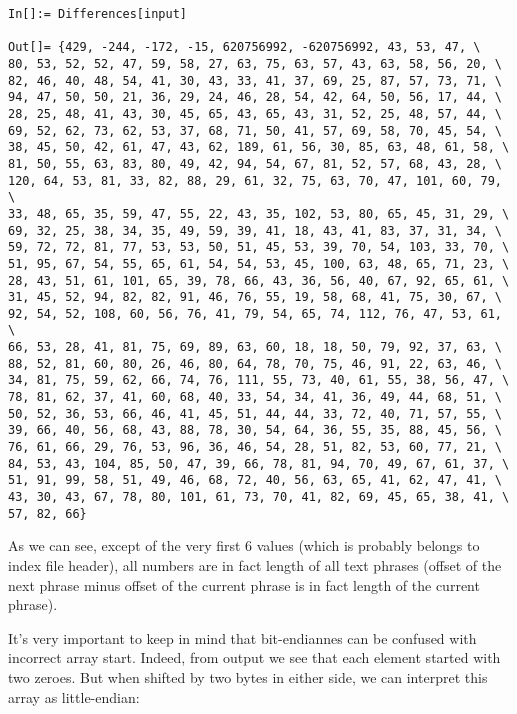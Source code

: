 \begin{lstlisting}
In[]:= Differences[input]

Out[]= {429, -244, -172, -15, 620756992, -620756992, 43, 53, 47, \
80, 53, 52, 52, 47, 59, 58, 27, 63, 75, 63, 57, 43, 63, 58, 56, 20, \
82, 46, 40, 48, 54, 41, 30, 43, 33, 41, 37, 69, 25, 87, 57, 73, 71, \
94, 47, 50, 50, 21, 36, 29, 24, 46, 28, 54, 42, 64, 50, 56, 17, 44, \
28, 25, 48, 41, 43, 30, 45, 65, 43, 65, 43, 31, 52, 25, 48, 57, 44, \
69, 52, 62, 73, 62, 53, 37, 68, 71, 50, 41, 57, 69, 58, 70, 45, 54, \
38, 45, 50, 42, 61, 47, 43, 62, 189, 61, 56, 30, 85, 63, 48, 61, 58, \
81, 50, 55, 63, 83, 80, 49, 42, 94, 54, 67, 81, 52, 57, 68, 43, 28, \
120, 64, 53, 81, 33, 82, 88, 29, 61, 32, 75, 63, 70, 47, 101, 60, 79, \
33, 48, 65, 35, 59, 47, 55, 22, 43, 35, 102, 53, 80, 65, 45, 31, 29, \
69, 32, 25, 38, 34, 35, 49, 59, 39, 41, 18, 43, 41, 83, 37, 31, 34, \
59, 72, 72, 81, 77, 53, 53, 50, 51, 45, 53, 39, 70, 54, 103, 33, 70, \
51, 95, 67, 54, 55, 65, 61, 54, 54, 53, 45, 100, 63, 48, 65, 71, 23, \
28, 43, 51, 61, 101, 65, 39, 78, 66, 43, 36, 56, 40, 67, 92, 65, 61, \
31, 45, 52, 94, 82, 82, 91, 46, 76, 55, 19, 58, 68, 41, 75, 30, 67, \
92, 54, 52, 108, 60, 56, 76, 41, 79, 54, 65, 74, 112, 76, 47, 53, 61, \
66, 53, 28, 41, 81, 75, 69, 89, 63, 60, 18, 18, 50, 79, 92, 37, 63, \
88, 52, 81, 60, 80, 26, 46, 80, 64, 78, 70, 75, 46, 91, 22, 63, 46, \
34, 81, 75, 59, 62, 66, 74, 76, 111, 55, 73, 40, 61, 55, 38, 56, 47, \
78, 81, 62, 37, 41, 60, 68, 40, 33, 54, 34, 41, 36, 49, 44, 68, 51, \
50, 52, 36, 53, 66, 46, 41, 45, 51, 44, 44, 33, 72, 40, 71, 57, 55, \
39, 66, 40, 56, 68, 43, 88, 78, 30, 54, 64, 36, 55, 35, 88, 45, 56, \
76, 61, 66, 29, 76, 53, 96, 36, 46, 54, 28, 51, 82, 53, 60, 77, 21, \
84, 53, 43, 104, 85, 50, 47, 39, 66, 78, 81, 94, 70, 49, 67, 61, 37, \
51, 91, 99, 58, 51, 49, 46, 68, 72, 40, 56, 63, 65, 41, 62, 47, 41, \
43, 30, 43, 67, 78, 80, 101, 61, 73, 70, 41, 82, 69, 45, 65, 38, 41, \
57, 82, 66}
\end{lstlisting}

As we can see, except of the very first 6 values (which is probably belongs to index file header), all numbers are in fact length of all text phrases (offset of the next phrase minus offset of the current phrase is in fact length of the current phrase).

It's very important to keep in mind that bit-endiannes can be confused with incorrect array start.
Indeed, from \IT{od} output we see that each element started with two zeroes.
But when shifted by two bytes in either side, we can interpret this array as little-endian:

